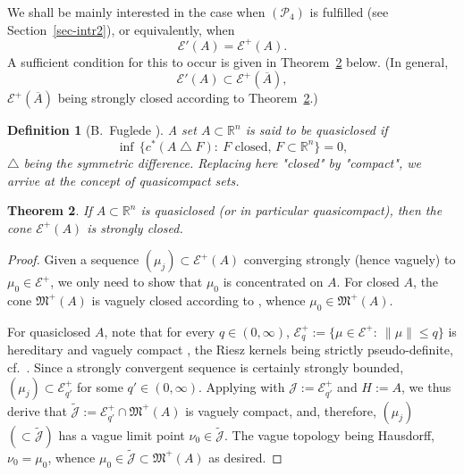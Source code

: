\documentclass[12pt,a4paper,reqno]{amsart} %
\theoremstyle{lause}
\theoremstyle{maaritelma}
\theoremstyle{lause}
\newtheorem{theorem}{Theorem}[section]
\theoremstyle{maaritelma}
\newtheorem{definition}[theorem]{Definition}
\numberwithin{equation}{section}
\begin{document}
We shall be mainly interested in the case when $(\mathcal P_4)$ is fulfilled (see Section~\ref{sec-intr2}), or equivalently, when
\begin{equation*}\label{Ecl}
 \mathcal E'(A)=\mathcal E^+(A).
\end{equation*}
A sufficient condition for this to occur is given in Theorem~\ref{l-quasi} below.
(In general,
\begin{equation}\label{belong}
\mathcal E'(A)\subset\mathcal E^+(\overline{A}),
\end{equation}
$\mathcal E^+(\overline{A})$ being strongly closed according to Theorem~\ref{l-quasi}.)

\begin{definition}[{\rm B.~Fuglede \cite{F71}}] A set $A\subset\mathbb R^n$ is said to be {\it quasiclosed} if
\begin{equation*}\label{def-q}
\inf\,\bigl\{c^*(A\bigtriangleup F):\ F\text{ closed, }F\subset\mathbb R^n\bigr\}=0,
\end{equation*}
$\bigtriangleup$ being the symmetric difference. Replacing here "closed" by "compact", we arrive at the concept of {\it quasicompact} sets.
\end{definition}

\begin{theorem}\label{l-quasi}If $A\subset\mathbb R^n$ is quasiclosed {\rm(}or in particular quasicompact{\rm)}, then the cone $\mathcal E^+(A)$ is strongly closed.
\end{theorem}

\begin{proof}
Given a sequence $(\mu_j)\subset\mathcal E^+(A)$ converging strongly (hence vaguely) to $\mu_0\in\mathcal E^+$, we only need to show that $\mu_0$ is concentrated on $A$. For closed $A$, the cone $\mathfrak M^+(A)$ is vaguely closed according to \cite[Section~III.2, Proposition~6]{B2}, whence $\mu_0\in\mathfrak M^+(A)$.

For quasiclosed $A$, note that for every $q\in(0,\infty)$, $\mathcal E^+_q:=\{\mu\in\mathcal E^+:\ \|\mu\|\leqslant q\}$
is hereditary \cite[Definition~5.2]{Fu4} and vaguely compact \cite[Lemma~2.5.1]{F1}, the Riesz kernels being strictly pseudo-definite, cf.\ \cite[p.~150]{F1}.
Since a strongly convergent sequence is certainly strongly bounded, $(\mu_j)\subset\mathcal E^+_{q'}$ for some $q'\in(0,\infty)$. Applying \cite[Corollary~6.2]{Fu4} with $\mathcal J:=\mathcal E^+_{q'}$ and $H:=A$, we thus derive that $\widetilde{\mathcal J}:=\mathcal E^+_{q'}\cap\mathfrak M^+(A)$ is vaguely compact, and, therefore, $(\mu_j)$ $({}\subset\widetilde{\mathcal J})$ has a vague limit point $\nu_0\in\widetilde{\mathcal J}$. The vague topology being Hausdorff, $\nu_0=\mu_0$, whence $\mu_0\in\widetilde{\mathcal J}\subset\mathfrak M^+(A)$ as desired.\end{proof}
\end{document}
